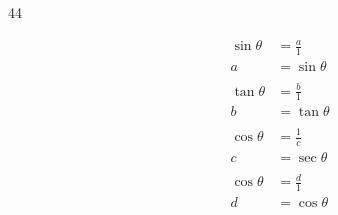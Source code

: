 \documentclass{exam}
\begin{document}
\begin{description}
      \item[44]
        \begin{align*}
          \sin \theta & = \frac{a}{1} \\
          a           & = \sin \theta \\
          \\
          \tan \theta & = \frac{b}{1} \\
          b           & = \tan \theta \\
          \\
          \cos \theta & = \frac{1}{c} \\
          c           & = \sec \theta \\
          \\
          \cos \theta & = \frac{d}{1} \\
          d           & = \cos \theta \\
          \\
        \end{align*}

    \end{description}

  \fi
\end{document}
